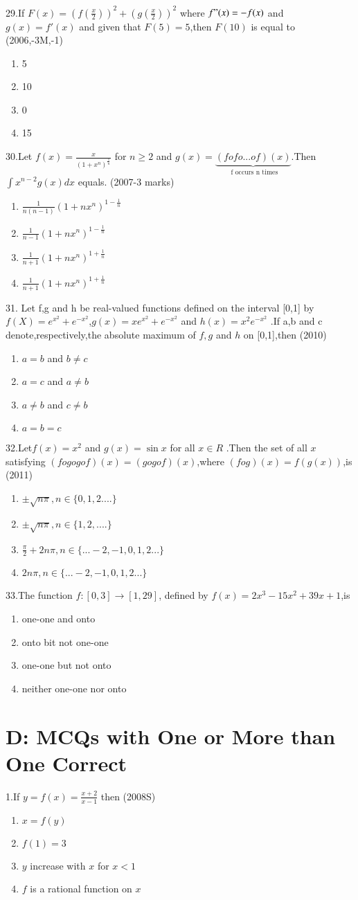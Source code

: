 \documentclass[journal,12pt,twocolumn]{IEEEtran}
\theoremstyle{remark}
\begin{document}
29.If $F(x)=\left( f\left( \frac{x}{2}\right) \right)^2 + \left(g\left (\frac{x}{2}\right) \right)^2$ where $f"(x)=-f(x)$ and $ g(x)=f'(x)$ and given that $F(5)=5$,then $F(10)$ is equal to 
\hfill(2006,-3M,-1)
\begin{enumerate}
    \item 5
    \item 10
    \item 0
    \item 15
\end{enumerate}
30.Let $f(x)=\frac{x}{(1+x^n)^\frac{1}{n}}$ for $ n\geq2$ and $g(x)= \underbrace {(fofo...of)(x)}_{\text{ f occurs n times}}$.Then $\int x^{n-2} g(x)dx$ equals.
\hfill(2007-3 marks)\\
\begin{enumerate}
    \item$ \frac{1}{n(n-1)} (1+nx^n)^{1-\frac{1}{n}} $
    \item$ \frac{1}{n-1} (1+nx^n)^{1-\frac{1}{n}} $
    \item$ \frac{1}{n+1} (1+nx^n)^{1+\frac{1}{n}} $
    \item$ \frac{1}{n+1} (1+nx^n)^{1+\frac{1}{n}} $
\end{enumerate}
31. Let f,g and h be real-valued functions defined on the interval [0,1] by $f(X)= e^{x^2} + e^{-x^2}$,$g(x)=xe^{x^2}+ e^{-x^2}$ and $h(x)=x^2e^{-x^2}$ .If a,b and c denote,respectively,the absolute maximum of $f,g$ and $h$ on [0,1],then 
\hfill(2010)
\begin{enumerate}
    \item $a=b$ and $b\neq c$
    \item $a=c$ and $a\neq b$
    \item $a\neq b$ and $c \neq b$
    \item $a=b=c$
\end{enumerate}
32.Let$f(x)=x^2$ and $g(x)=\sin x$ for all $x\in R$ .Then the set of all $x$ satisfying $(fogogof)(x)=(gogof)(x)$,where $(fog)(x)=f(g(x))$,is
\hfill(2011)
\begin{enumerate}
    \item $ \pm \sqrt{n\pi},n\in \{0,1,2....\}$
    \item $ \pm \sqrt{n\pi},n\in \{1,2,....\}$
    \item $ \frac{\pi}{2}+2n\pi,n \in\{...-2,-1,0,1,2...\} $
    \item $ 2n\pi,n\in \{...-2,-1,0,1,2...\}$
\end{enumerate}
33.The function $ f:[0,3] \rightarrow [1,29] $, defined by $ f(x)=2x^3-15x^2+39x+1 $,is 
\begin{enumerate}
    \item one-one and onto 
    \item onto bit not one-one 
    \item one-one but not onto
    \item neither one-one nor onto
\end{enumerate}
\section {D: MCQs with One or More than One Correct}
1.If $y=f(x)=\frac{x+2}{x-1}$ then
\hfill(2008S)
\begin{enumerate}
    \item $x=f(y)$
    \item $f(1)=3$
    \item $y$ increase with $x$ for $x<1$
    \item $f$ is a rational function on $x$
\end{enumerate}
\end{document}
